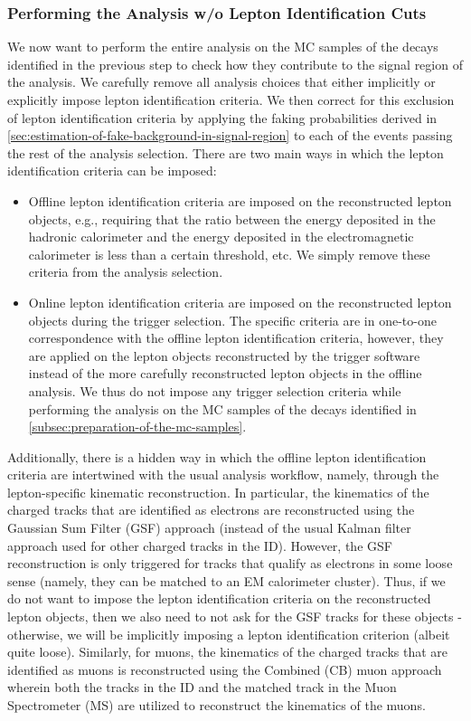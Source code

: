 \subsubsection{Performing the Analysis w/o Lepton Identification Cuts}
\label{subsec:performing-analysis-w-o-lepton-identification-cuts}
We now want to perform the entire analysis on the MC samples of the decays identified in the previous step to check how they contribute to the signal region of the analysis. %
We carefully remove all analysis choices that either implicitly or explicitly impose lepton identification criteria. %
We then correct for this exclusion of lepton identification criteria by applying the faking probabilities derived in \ref{sec:estimation-of-fake-background-in-signal-region} to each of the events passing the rest of the analysis selection. %
There are two main ways in which the lepton identification criteria can be imposed:
\begin{itemize}
    \item Offline lepton identification criteria are imposed on the reconstructed lepton objects, e.g., requiring that the ratio between the energy deposited in the hadronic calorimeter and the energy deposited in the electromagnetic calorimeter is less than a certain threshold, etc. We simply remove these criteria from the analysis selection. %
    \item Online lepton identification criteria are imposed on the reconstructed lepton objects during the trigger selection. The specific criteria are in one-to-one correspondence with the offline lepton identification criteria, however, they are applied on the lepton objects reconstructed by the trigger software instead of the more carefully reconstructed lepton objects in the offline analysis. We thus do not impose any trigger selection criteria while performing the analysis on the MC samples of the decays identified in \ref{subsec:preparation-of-the-mc-samples}. %
\end{itemize}
Additionally, there is a hidden way in which the offline lepton identification criteria are intertwined with the usual analysis workflow, namely, through the lepton-specific kinematic reconstruction. In particular, the kinematics of the charged tracks that are identified as electrons are reconstructed using the Gaussian Sum Filter (GSF) approach (instead of the usual Kalman filter approach used for other charged tracks in the ID). However, the GSF reconstruction is only triggered for tracks that qualify as electrons in some loose sense (namely, they can be matched to an EM calorimeter cluster). Thus, if we do not want to impose the lepton identification criteria on the reconstructed lepton objects, then we also need to not ask for the GSF tracks for these objects - otherwise, we will be implicitly imposing a lepton identification criterion (albeit quite loose). Similarly, for muons, the kinematics of the charged tracks that are identified as muons is reconstructed using the Combined (CB) muon approach wherein both the tracks in the ID and the matched track in the Muon Spectrometer (MS) are utilized to reconstruct the kinematics of the muons. %
